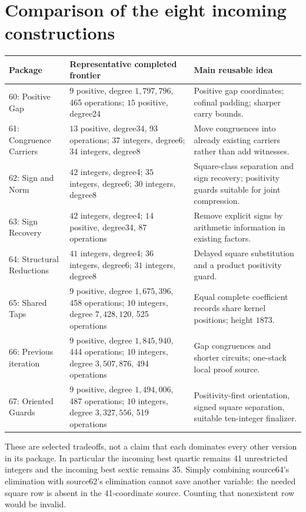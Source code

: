 \section{Comparison of the eight incoming constructions}
\begin{center}\small
\begin{tabular}{@{}p{29mm}p{45mm}p{71mm}@{}}\toprule
Package & Representative completed frontier & Main reusable idea\\\midrule
60: Positive Gap & $9$ positive, degree $1{,}797{,}796$, 465 operations; $15$ positive, degree24 & Positive gap coordinates; cofinal padding; sharper carry bounds.\\
61: Congruence Carriers & $13$ positive, degree34, 93 operations; $37$ integers, degree6; $34$ integers, degree8 & Move congruences into already existing carriers rather than add witnesses.\\
62: Sign and Norm & $42$ integers, degree4; $35$ integers, degree6; $30$ integers, degree8 & Square-class separation and sign recovery; positivity guards suitable for joint compression.\\
63: Sign Recovery & $42$ integers, degree4; $14$ positive, degree34, 87 operations & Remove explicit signs by arithmetic information in existing factors.\\
64: Structural Reductions & $41$ integers, degree4; $36$ integers, degree6; $31$ integers, degree8 & Delayed square substitution and a product positivity guard.\\
65: Shared Taps & $9$ positive, degree $1{,}675{,}396$, 458 operations; $10$ integers, degree $7{,}428{,}120$, 525 operations & Equal complete coefficient records share kernel positions; height $1873$.\\
66: Previous iteration & $9$ positive, degree $1{,}845{,}940$, 444 operations; $10$ integers, degree $3{,}507{,}876$, 494 operations & Gap congruences and shorter circuits; one-stack local proof source.\\
67: Oriented Guards & $9$ positive, degree $1{,}494{,}006$, 487 operations; $10$ integers, degree $3{,}327{,}556$, 519 operations & Positivity-first orientation, signed square separation, suitable ten-integer finalizer.\\\bottomrule
\end{tabular}\end{center}
These are selected tradeoffs, not a claim that each dominates every other
version in its package. In particular the incoming best quartic remains
41 unrestricted integers and the incoming best sextic remains 35.
Simply combining source64's elimination with source62's elimination
cannot save another variable: the needed square row is absent in the
41-coordinate source. Counting that nonexistent row would be invalid.

